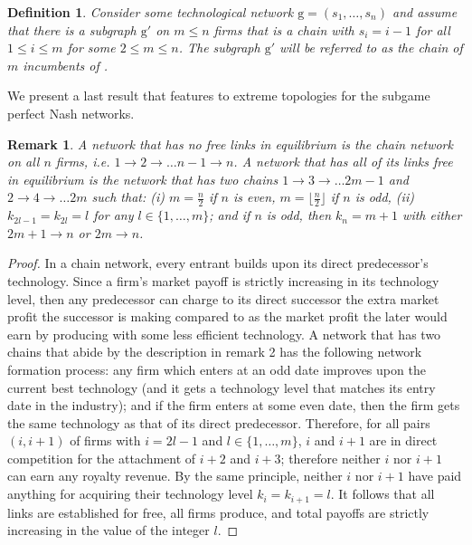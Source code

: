 \documentclass{article}
\newtheorem{definition}{Definition}
\newtheorem{remark}{Remark}
\begin{document}
\begin{definition}
Consider some technological network $\text{g}=(s_1,\ldots, s_n)$ and assume that there is a subgraph $\text{g}'$ on $m\leq n$ firms that is a chain with $s_i=i-1$ for all $1\leq i \leq m$ for some $2\leq m\leq n$. The subgraph $\text{g}'$ will be referred to as the chain of $m$ incumbents of .
\end{definition}






\indent We present a last result that features to extreme topologies for the subgame perfect Nash networks. \\

\begin{remark}
A network that has no free links in equilibrium is the chain network on all $n$ firms, i.e. $1\rightarrow 2\rightarrow \ldots n-1 \rightarrow n$. A network that has all of its links free in equilibrium is the network that has two chains $1\rightarrow 3\rightarrow \ldots 2m-1$ and $2\rightarrow 4 \rightarrow \ldots 2m$ such that: (i) $m=\frac{n}{2}$ if $n$ is even, $m=\lfloor \frac{n}{2} \rfloor$ if $n$ is odd, (ii) $k_{2l-1}=k_{2l}=l$ for any $l\in \{1,\ldots, m\}$; and if $n$ is odd, then $k_n=m+1$ with either $2m+1\rightarrow n$ or $2m\rightarrow n$.  
\end{remark} 
\begin{proof}
In a chain network, every entrant builds upon its direct predecessor's technology. Since a firm's market payoff is strictly increasing in its technology level, then any predecessor can charge to its direct successor the extra market profit the successor is making compared to as the market profit the later would earn by producing with some less efficient technology. A network that has two chains that abide by the description in remark 2 has the following network formation process: any firm which enters at an odd date improves upon the current best technology (and it gets a technology level that matches its entry date in the industry); and if the firm enters at some even date, then the firm gets the same technology as that of its direct predecessor. Therefore, for all pairs $(i,i+1)$ of firms with $i=2l-1$ and $l\in \{1,\ldots, m\}$, $i$ and $i+1$ are in direct competition for the attachment of $i+2$ and $i+3$; therefore neither $i$ nor $i+1$ can earn any royalty revenue. By the same principle, neither $i$ nor $i+1$ have paid anything for acquiring their technology level $k_i=k_{i+1}=l$. It follows that all links are established for free, all firms produce, and total payoffs are strictly increasing in the value of the integer $l$. 
\end{proof}
\end{document}
